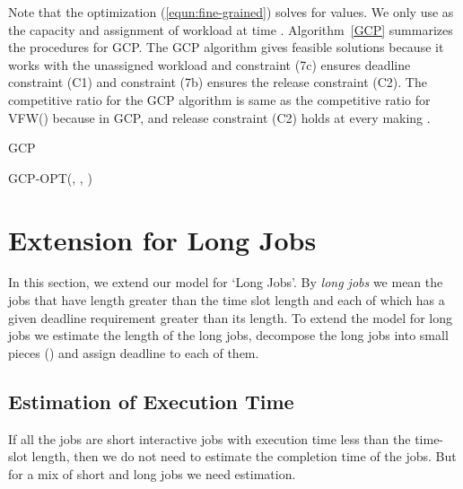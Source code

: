 \documentclass[10pt,conference,compsocconf,letterpaper]{IEEEtran}
\begin{document}
Note that the optimization (\ref{equn:fine-grained}) solves for  values. We only use  as the capacity and assignment of workload at time . Algorithm~\ref{GCP} summarizes the procedures for GCP. The GCP algorithm gives feasible solutions because it works with the unassigned workload and constraint (7c) ensures deadline constraint (C1) and constraint (7b) ensures the release constraint (C2). The competitive ratio for the GCP algorithm is same as the competitive ratio for VFW() because in GCP,  and release constraint (C2) holds at every  making .


\begin{algorithm}[!t]
\caption{GCP}
\label{GCP}
{\small{
\begin{algorithmic}[1]
\STATE 
\STATE 
{}
\STATE           {}
\IF { }
\STATE 
\ELSE
\STATE 
\IF { }
\STATE 
\ELSE
\STATE 
\ENDIF
\ENDIF
\ENDFOR
\STATE 
\STATE   GCP-OPT(, , )
\STATE 
\ENDFOR
\end{algorithmic}
}}
\end{algorithm}




\section{Extension for Long Jobs}
In this section, we extend our model for `Long Jobs'. By {\it long jobs} we mean the jobs that have length greater than the time slot length  and each of which has a given deadline requirement greater than its length. To extend the model for long jobs we estimate the length of the long jobs, decompose the long jobs into small pieces () and assign deadline to each of them.




\subsection{Estimation of Execution Time}
If all the jobs are short interactive jobs with execution time less than the time-slot length, then we do not need to estimate the completion time of the jobs. But for a mix of short and long jobs we need estimation.
\end{document}
